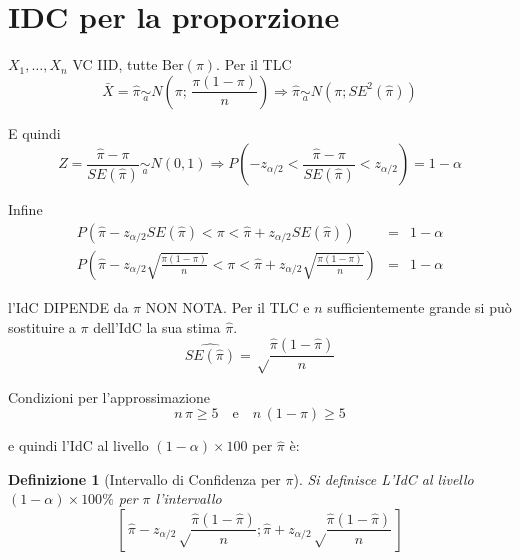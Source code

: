 \documentclass[
  11pt,
]{book}
\theoremstyle{mytheoremstyle}
\theoremstyle{mydefstyle}
\newtheorem{definition}{Definizione}[section]
\begin{document}
\section{IDC per la proporzione}\label{idc-per-la-proporzione}

\(X_{1}, \ldots, X_{n}\) VC IID, tutte \(\text{Ber}(\pi)\). Per il TLC
\[\bar{X} = \hat\pi \operatorname*{\sim}_a
    N\left( \pi;\, \frac{\pi (1-\pi)} {n} \right) \Rightarrow \hat\pi \operatorname*{\sim}_a N\left( \pi; SE^2(\hat\pi)\right)\]

E quindi
\[Z = \frac{\hat\pi - \pi} {SE(\hat\pi)} \operatorname*{\sim}_a N(0,1) \Rightarrow P\left(-z_{\alpha/2} < \frac{\hat\pi - \pi} {SE(\hat\pi)}   < z_{\alpha/2} \right) = 1-\alpha
    \]

Infine
\begin{eqnarray*}
P\left(\hat\pi -z_{\alpha/2} {SE(\hat\pi)} < \pi
          <\hat\pi +z_{\alpha/2} {SE(\hat\pi)} \right) &=& 1-\alpha \\
P\left(\hat\pi -z_{\alpha/2} \sqrt{\frac{\pi(1-\pi)}{n}} < \pi
          <\hat\pi +z_{\alpha/2} \sqrt{\frac{\pi(1-\pi)}{n}} \right) &=& 1-\alpha
\end{eqnarray*}

l'IdC DIPENDE da \(\pi\) NON NOTA.
Per il TLC e \(n\) sufficientemente grande si può sostituire
a \(\pi\) dell'IdC la sua stima \(\hat\pi\).
\[\widehat{SE(\hat\pi)}=\sqrt\frac{\hat\pi(1-\hat\pi)}{n}\]

Condizioni per l'approssimazione
\[n\, \pi \ge 5 \quad\text{e}\quad  n\, (1-\pi) \ge 5\]

e quindi l'IdC al livello \((1-\alpha)\times 100\) per \(\hat\pi\) è:

\begin{info}

\begin{definition}[Intervallo di Confidenza per $\pi$]
Si definisce L'IdC al livello \((1-\alpha)\times100\%\) per \(\pi\) l'intervallo
\[\left[\,\hat\pi-z_{\alpha/2}\sqrt\frac{\hat\pi(1-\hat\pi)}{n};\hat\pi+z_{\alpha/2}\sqrt\frac{\hat\pi(1-\hat\pi)}{n}\,\right]\]
\end{definition}

\end{info}
\end{document}
